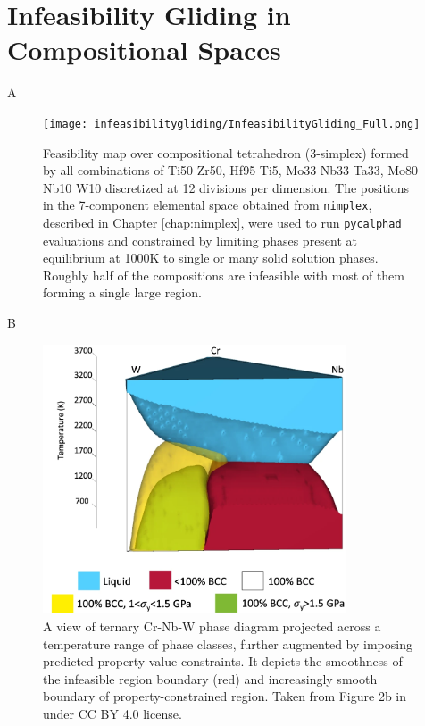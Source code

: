 \chapter{Infeasibility Gliding in Compositional Spaces} \label{chap:infeasibilitygliding}

A

\begin{figure}[h]
    \centering
    \texttt{[image: infeasibilitygliding/InfeasibilityGliding\_Full.png]}
    \caption{Feasibility map over compositional tetrahedron (3-simplex) formed by all combinations of Ti50 Zr50, Hf95 Ti5, Mo33 Nb33 Ta33, Mo80 Nb10 W10 discretized at 12 divisions per dimension. The positions in the 7-component elemental space obtained from \texttt{nimplex}, described in Chapter \ref{chap:nimplex}, were used to run \texttt{pycalphad} \cite{Otis2017Pycalphad:Python} evaluations and constrained by limiting phases present at equilibrium at 1000K to single or many solid solution phases. Roughly half of the compositions are infeasible with most of them forming a single large region.}
    \label{fig:fullcomputation}
\end{figure}

B

\begin{figure}[h]
    \centering
    \includegraphics[width=0.8\textwidth]{infeasibilitygliding/PhaseTernaryMap_Elder2023.png}
    \caption{A view of ternary Cr-Nb-W phase diagram projected across a temperature range of phase classes, further augmented by imposing predicted property value constraints. It depicts the smoothness of the infeasible region boundary (red) and increasingly smooth boundary of property-constrained region. Taken from Figure 2b in \citet{Elder2023ComputationalValidation} under CC BY 4.0 license.}
    \label{fig:katesphasemap}
\end{figure}

